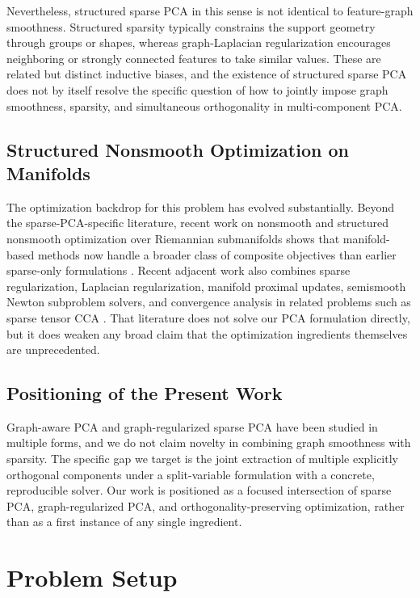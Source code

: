 \documentclass[10pt,twocolumn,letterpaper]{article}
\theoremstyle{definition}
\begin{document}
Nevertheless, structured sparse PCA in this sense is not identical to feature-graph smoothness. Structured sparsity typically constrains the support geometry through groups or shapes, whereas graph-Laplacian regularization encourages neighboring or strongly connected features to take similar values. These are related but distinct inductive biases, and the existence of structured sparse PCA does not by itself resolve the specific question of how to jointly impose graph smoothness, sparsity, and simultaneous orthogonality in multi-component PCA.

\subsection{Structured Nonsmooth Optimization on Manifolds}
The optimization backdrop for this problem has evolved substantially. Beyond the sparse-PCA-specific literature, recent work on nonsmooth and structured nonsmooth optimization over Riemannian submanifolds shows that manifold-based methods now handle a broader class of composite objectives than earlier sparse-only formulations \cite{li2024structurednonsmooth,chen2024nonsmoothstiefel}. Recent adjacent work also combines sparse regularization, Laplacian regularization, manifold proximal updates, semismooth Newton subproblem solvers, and convergence analysis in related problems such as sparse tensor CCA \cite{zhu2025stccal}. That literature does not solve our PCA formulation directly, but it does weaken any broad claim that the optimization ingredients themselves are unprecedented.

\subsection{Positioning of the Present Work}
Graph-aware PCA and graph-regularized sparse PCA have been studied in multiple forms, and we do not claim novelty in combining graph smoothness with sparsity. The specific gap we target is the joint extraction of multiple explicitly orthogonal components under a split-variable formulation with a concrete, reproducible solver. Our work is positioned as a focused intersection of sparse PCA, graph-regularized PCA, and orthogonality-preserving optimization, rather than as a first instance of any single ingredient.

\section{Problem Setup}
\label{sec:setup}
\end{document}
